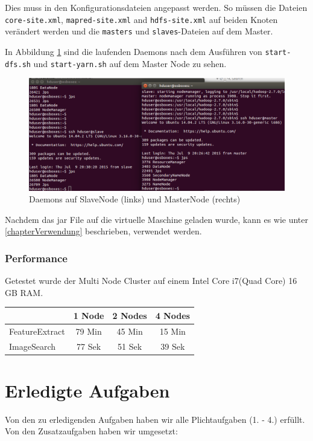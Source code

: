 \documentclass[paper=a4, fontsize=11pt]{scrartcl} %
\numberwithin{equation}{section} %
\numberwithin{figure}{section} %
\numberwithin{table}{section} %
\begin{document}
Dies muss in den Konfigurationsdateien angepasst werden. So müssen die Dateien \lstinline$core-site.xml$, \lstinline$mapred-site.xml$ and \lstinline$hdfs-site.xml$ auf beiden Knoten verändert werden und die \lstinline$masters$ und \lstinline$slaves$-Dateien auf dem Master.

In Abbildung \ref{fig:s4} sind die laufenden Daemons nach dem Ausführen von \lstinline$start-dfs.sh$ und \lstinline$start-yarn.sh$ auf dem Master Node zu sehen. 

\begin{figure}[H]
\begin{center}
	\includegraphics[width=\textwidth]{images/screen4}
	\caption{Daemons auf SlaveNode (links) und MasterNode (rechts)}
	\label{fig:s4}
\end{center}
\end{figure}

Nachdem das jar File auf die virtuelle Maschine geladen wurde, kann es wie unter \ref{chapterVerwendung} beschrieben, verwendet werden.

\subsubsection{Performance}
Getestet wurde der Multi Node Cluster auf einem Intel Core i7(Quad Core)  16 GB RAM. 

\begin{tabular}{|l|c|c|c|}
	\hline & 1 Node & 2 Nodes & 4 Nodes \\
	\hline FeatureExtract & 79 Min & 45 Min & 15 Min \\
	\hline ImageSearch & 77 Sek & 51 Sek & 39 Sek \\
	\hline
\end{tabular}

\section{Erledigte Aufgaben}
Von den zu erledigenden Aufgaben haben wir alle Plichtaufgaben (1. - 4.) erfüllt. Von den Zusatzaufgaben haben wir umgesetzt:
\end{document}
